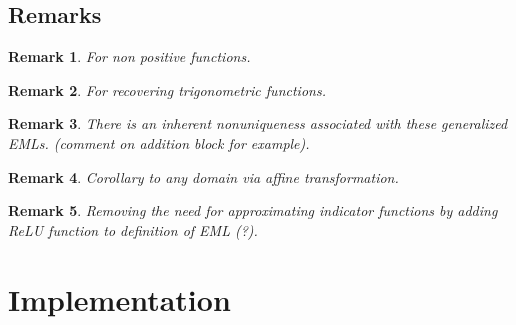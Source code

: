 \documentclass{article}
\newtheorem{rem}{Remark}
\numberwithin{Def}{section}
\begin{document}
\subsection{Remarks}
\begin{rem}
    For non positive functions.
\end{rem}

\begin{rem}
    For recovering trigonometric functions.
\end{rem}

\begin{rem}
    There is an inherent nonuniqueness associated with these generalized EMLs. (comment on addition block for example).
\end{rem}

\begin{rem}
    Corollary to any domain via affine transformation.
\end{rem}

\begin{rem}
    Removing the need for approximating indicator functions by adding ReLU function to definition of EML (?).
\end{rem}

\section{Implementation}
\label{sec:implementation}

\end{document}
